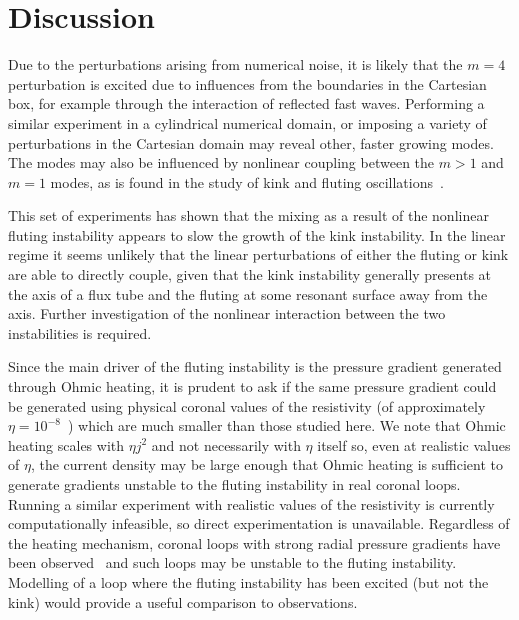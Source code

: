 \section{Discussion}

Due to the perturbations arising from numerical noise, it is likely that the $m=4$ perturbation is excited due to influences from the boundaries in the Cartesian box, for example through the interaction of reflected fast waves. Performing a similar experiment in a cylindrical numerical domain, or imposing a variety of perturbations in the Cartesian domain may reveal other, faster growing modes. The modes may also be influenced by nonlinear coupling between the $m>1$ and $m=1$ modes, as is found in the study of kink and fluting oscillations~\cite{terradasEffectMagneticTwist2018,rudermanNonlinearGenerationFluting2017a}.

This set of experiments has shown that the mixing as a result of the nonlinear fluting instability appears to slow the growth of the kink instability. In the linear regime it seems unlikely that the linear perturbations of either the fluting or kink are able to directly couple, given that the kink instability generally presents at the axis of a flux tube and the fluting at some resonant surface away from the axis. Further investigation of the nonlinear interaction between the two instabilities is required.

Since the main driver of the fluting instability is the pressure gradient generated through Ohmic heating, it is prudent to ask if the same pressure gradient could be generated using physical coronal values of the resistivity (of approximately $\eta=10^{-8}$~\cite{craigAnisotropicViscousDissipation2009a}) which are much smaller than those studied here. We note that Ohmic heating scales with $\eta j^2$ and not necessarily with $\eta$ itself so, even at realistic values of $\eta$, the current density may be large enough that Ohmic heating is sufficient to generate gradients unstable to the fluting instability in real coronal loops. Running a similar experiment with realistic values of the resistivity is currently computationally infeasible, so direct experimentation is unavailable. Regardless of the heating mechanism, coronal loops with strong radial pressure gradients have been observed~\cite{foukalTemperatureStructurePressure1975} and such loops may be unstable to the fluting instability. Modelling of a loop where the fluting instability has been excited (but not the kink) would provide a useful comparison to observations.


